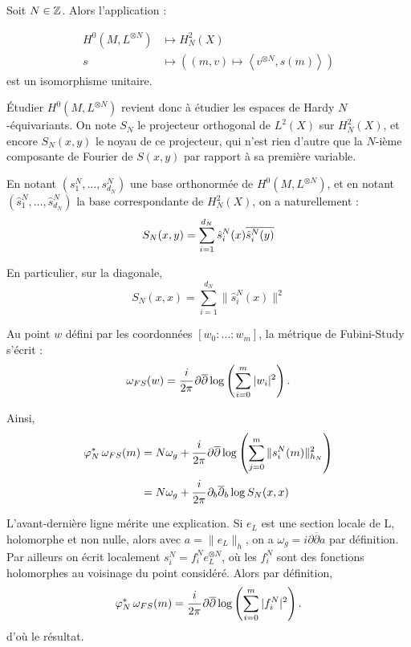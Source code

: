\begin{prop} Soit $N \in \mathbb{Z}$. Alors l'application :

\begin{align*}
	H^0(M,L^{\otimes N}) &\mapsto H^2_N(X) \\
	s &\mapsto \left((m,v) \mapsto \left\langle v^{\otimes N}, s(m)\right\rangle \right)
\end{align*}
est un isomorphisme unitaire.
\end{prop}

Étudier $H^0(M,L^{\otimes N})$ revient donc à étudier les espaces de Hardy $N$-équivariants. On note $S_N$ le projecteur orthogonal de $L^2(X)$ sur $H^2_N(X)$, et encore $S_N(x,y)$ le noyau de ce projecteur, qui n'est rien d'autre que la $N$-ième composante de Fourier de $S(x,y)$ par rapport à sa première variable.

En notant $(s^N_1, \ldots, s^N_{d_N})$ une base orthonormée de $H^0(M,L^{\otimes N})$, et en notant $(\hat{s}^N_1, \ldots, \hat{s}^N_{d_N})$ la base correspondante de $H^2_N(X)$, on a naturellement :
\begin{equation*}
	S_N(x,y)=\sum_{i=1}^{d_N}\hat{s}^N_i(x) \overline{\hat{s}^N_i(y)\strut}
\end{equation*}

En particulier, sur la diagonale,
\begin{equation*}
	S_N(x,x)=\sum_{i=1}^{d_N}\|\hat{s}^N_i(x)\|^2
\end{equation*}

Au point $w$ défini par les coordonnées $[w_0:\ldots:w_m]$, la métrique de Fubini-Study s'écrit :
\begin{equation*}
	\omega_{FS}(w) = \cfrac{i}{2\pi}\,\partial\overline{\partial} \log\left(\sum_{i=0}^m|w_i|^2\right).
\end{equation*}

Ainsi,
\begin{align*}
	\varphi_N^*\,\omega_{FS}(m) &= N \omega_g + \cfrac{i}{2\pi}\,\partial\overline{\partial} \log\left(\sum_{j=0}^m\|s^N_i(m)\|_{h_N}^2\right)\\
	&= N\omega_g + \cfrac{i}{2\pi}\,\partial_b\overline{\partial}_b \log S_N(x,x)
\end{align*}

L'avant-dernière ligne mérite une explication. Si $e_L$ est une section locale de L, holomorphe et non nulle, alors avec $a=\|e_L\|_h$, on a $\omega_g = i \partial \overline{\partial}a$ par définition. Par ailleurs on écrit localement $s^N_i=f_i^Ne_L^{\otimes N}$, où les $f^N_i$ sont des fonctions holomorphes au voisinage du point considéré. Alors par définition, 
\begin{equation*}
	\varphi_N^*\,\omega_{FS}(m) = \cfrac{i}{2\pi}\,\partial\overline{\partial} \log\left(\sum_{i=0}^m|f^N_i|^2\right).
\end{equation*}
d'où le résultat.


